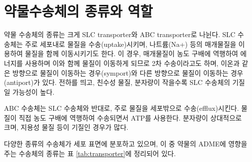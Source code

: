 \documentclass[
  11pt,
  krantz2, a4paper, twoside]{krantz}
\begin{document}
\hypertarget{uxc57duxbb3cuxc218uxc1a1uxccb4uxc758-uxc885uxb958uxc640-uxc5eduxd560}{%
\section{약물수송체의 종류와 역할}\label{uxc57duxbb3cuxc218uxc1a1uxccb4uxc758-uxc885uxb958uxc640-uxc5eduxd560}}

약물 수송체의 종류는 크게 SLC transporter와 ABC transporter로 나뉜다.
SLC 수송체는 주로 세포내로 물질을 수송(uptake)시키며, 나트륨(Na+) 등의
매개물질을 이용하여 물질을 함께 이동시키기도 한다. 이 경우, 매개물질이
농도 구배에 역행하여 에너지를 사용하며 이와 함께 물질이 이동하게 되므로
2차 수송이라고도 하며, 이온과 같은 방향으로 물질이 이동하는
경우(symport)와 다른 방향으로 물질이 이동하는 경우(antiport)가 있다.
전하를 띄고, 친수성 물질, 분자량이 작을수록 SLC 수송체의 기질일 가능성이
높다.

ABC 수송체는 SLC 수송체와 반대로, 주로 물질을 세포밖으로
수송(efflux)시킨다. 물질이 직접 농도 구배에 역행하여 수송되면서 ATP를
사용한다. 분자량이 상대적으로 크며, 지용성 물질 등이 기질인 경우가 많다.

다양한 종류의 수송체가 세포 표면에 분포하고 있으며, 이 중 약물의 ADME에
영향을 주는 수송체의 종류는 표 \ref{tab:transporter}에 정리되어 있다.
\end{document}
